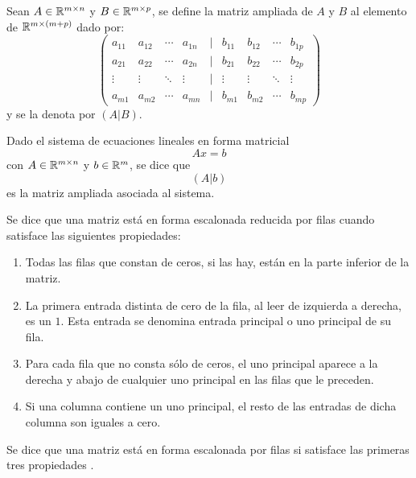 \documentclass[a4,11pt]{aleph-notas}
\begin{document}
\begin{defi}
    Sean $A\in\Mat[\R]{m}{n}$ y $B\in\Mat[\R]{m}{p}$, se define la matriz ampliada de $A$ y $B$ al elemento de $\Mat[\R]{m}{(m+p)}$ dado por:
    \[
        \begin{pmatrix}
        a_{11}&a_{12}&\cdots&a_{1n}&|&b_{11}&b_{12}&\cdots&b_{1p}\\
        a_{21}&a_{22}&\cdots&a_{2n}&|&b_{21}&b_{22}&\cdots&b_{2p}\\
        \vdots&\vdots&\ddots&\vdots&|&\vdots&\vdots&\ddots&\vdots\\
        a_{m1}&a_{m2}&\cdots&a_{mn}&|&b_{m1}&b_{m2}&\cdots&b_{mp}
        \end{pmatrix}
    \]
    y se la denota por $(A|B)$.
\end{defi}

\begin{defi}
    Dado el sistema de ecuaciones lineales en forma matricial
    \[
        Ax=b
    \]
    con $A\in \Mat[\R]{m}{n}$ y $b\in\R^m$, se dice que 
    \[
        (A|b)
    \]
    es la matriz ampliada asociada al sistema.
\end{defi}

\begin{defi}
    Se dice que una matriz está en forma escalonada reducida por filas cuando satisface las siguientes propiedades:
    \begin{enumerate}
    \item 
        Todas las filas que constan de ceros, si las hay, están en la parte inferior de la matriz. 
    \item 
        La primera entrada distinta de cero de la fila, al leer de izquierda a derecha, es un $1$. Esta entrada se denomina entrada principal o uno principal de su fila. 
    \item 
        Para cada fila que no consta sólo de ceros, el uno principal aparece a la derecha y abajo de cualquier uno principal en las filas que le preceden. 
    \item 
        Si una columna contiene un uno principal, el resto de las entradas de dicha columna son iguales a cero. 
    \end{enumerate}
    Se dice que una matriz está en forma escalonada por filas si satisface las primeras tres propiedades . 
\end{defi}
\end{document}
